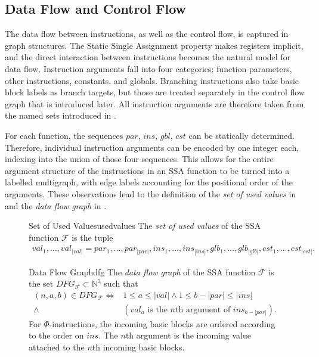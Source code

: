 \subsection{Data Flow and Control Flow}

    The data flow between instructions, as well as the control flow, is captured
    in graph structures.
    The Static Single Assignment property makes registers implicit, and the
    direct interaction between instructions becomes the natural model for data
    flow.
    Instruction arguments fall into four categories: function parameters,
    other instructions, constants, and globals.
    Branching instructions also take basic block labels as branch targets,
    but those are treated separately in the control flow graph that is
    introduced later.
    All instruction arguments are therefore taken from the named sets introduced
    in .

    For each function, the sequences $par$, $ins$, $gbl$, $cst$ can be
    statically determined.
    Therefore, individual instruction arguments can be encoded by one integer
    each, indexing into the union of those four sequences.
    This allows for the entire argument structure of the instructions in an SSA
    function to be turned into a labelled multigraph, with edge labels
    accounting for the positional order of the arguments.
    These observations lead to the definition of the {\it set of used values} in
     and the {\it data flow graph} in .

\begin{figure}[h]
\begin{definition}{Set of Used Values}{usedvalues}
    The {\em set of used values} of the SSA function $\mathcal F$ is the tuple
    \begin{align*}
       val_1,\dots,val_{|val|} = par_1,\dots,par_{|par|},
                                 ins_1,\dots,ins_{|ins|},
                                 glb_1,\dots,glb_{|glb|},
                                 cst_1,\dots,cst_{|cst|}.
    \end{align*}
\end{definition}

\begin{definition}{Data Flow Graph}{dfg}
    The {\em data flow graph} of the SSA function $\mathcal F$ is the set
    $DFG_{\mathcal F}\subset \mathbb N^3$ such that
    \begin{align*}
        (n,a,b)\in DFG_{\mathcal F}\iff{}&1\leq a\leq |val|
            \mathrel{\land}1\leq b-|par|\leq |ins|\\
            \mathrel{\land}{}&(val_a\text{ is the $n$th argument of }ins_{b-|par|}).
    \end{align*}
    For $\Phi$-instructions, the incoming basic blocks are ordered according to
    the order on $ins$.
    The $n$th argument is the incoming value attached to the $n$th incoming
    basic blocks.
\end{definition}
\end{figure}

